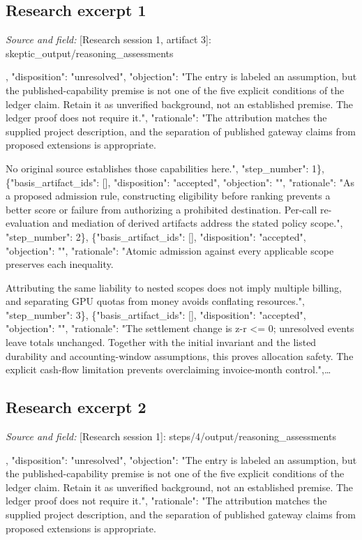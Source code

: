 \documentclass[11pt]{article}
\begin{document}
\subsection{Research excerpt 1}
\textit{Source and field: }[Research session 1, artifact 3]: skeptic\_output/reasoning\_assessments\par
[\{"basis\_artifact\_ids": [], "disposition": "unresolved", "objection": "The entry is labeled an assumption, but the published-capability premise is not one of the five explicit conditions of the ledger claim. Retain it as unverified background, not an established premise. The ledger proof does not require it.", "rationale": "The attribution matches the supplied project description, and the separation of published gateway claims from proposed extensions is appropriate.

No original source establishes those capabilities here.", "step\_number": 1\}, \{"basis\_artifact\_ids": [], "disposition": "accepted", "objection": "", "rationale": "As a proposed admission rule, constructing eligibility before ranking prevents a better score or failure from authorizing a prohibited destination. Per-call re-evaluation and mediation of derived artifacts address the stated policy scope.", "step\_number": 2\}, \{"basis\_artifact\_ids": [], "disposition": "accepted", "objection": "", "rationale": "Atomic admission against every applicable scope preserves each inequality.

Attributing the same liability to nested scopes does not imply multiple billing, and separating GPU quotas from money avoids conflating resources.", "step\_number": 3\}, \{"basis\_artifact\_ids": [], "disposition": "accepted", "objection": "", "rationale": "The settlement change is z-r \textless{}= 0; unresolved events leave totals unchanged. Together with the initial invariant and the listed durability and accounting-window assumptions, this proves allocation safety. The explicit cash-flow limitation prevents overclaiming invoice-month control.",\ldots{}

\subsection{Research excerpt 2}
\textit{Source and field: }[Research session 1]: steps/4/output/reasoning\_assessments\par
[\{"basis\_artifact\_ids": [], "disposition": "unresolved", "objection": "The entry is labeled an assumption, but the published-capability premise is not one of the five explicit conditions of the ledger claim. Retain it as unverified background, not an established premise. The ledger proof does not require it.", "rationale": "The attribution matches the supplied project description, and the separation of published gateway claims from proposed extensions is appropriate.
\end{document}
